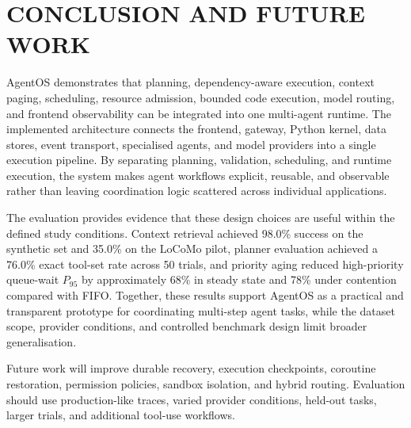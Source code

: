 \chapter{\uppercase{Conclusion and Future Work}}
\label{chap:conclusion}

AgentOS demonstrates that planning, dependency-aware execution, context paging, scheduling, resource admission, bounded code execution, model routing, and frontend observability can be integrated into one multi-agent runtime. The implemented architecture connects the frontend, gateway, Python kernel, data stores, event transport, specialised agents, and model providers into a single execution pipeline. By separating planning, validation, scheduling, and runtime execution, the system makes agent workflows explicit, reusable, and observable rather than leaving coordination logic scattered across individual applications.

The evaluation provides evidence that these design choices are useful within the defined study conditions. Context retrieval achieved 98.0\% success on the synthetic set and 35.0\% on the LoCoMo pilot, planner evaluation achieved a 76.0\% exact tool-set rate across 50 trials, and priority aging reduced high-priority queue-wait $P_{95}$ by approximately 68\% in steady state and 78\% under contention compared with FIFO. Together, these results support AgentOS as a practical and transparent prototype for coordinating multi-step agent tasks, while the dataset scope, provider conditions, and controlled benchmark design limit broader generalisation.

Future work will improve durable recovery, execution checkpoints, coroutine restoration, permission policies, sandbox isolation, and hybrid routing. Evaluation should use production-like traces, varied provider conditions, held-out tasks, larger trials, and additional tool-use workflows.

